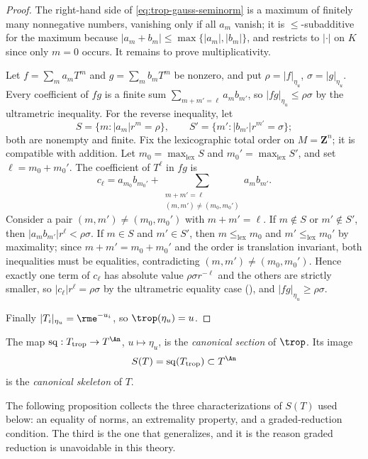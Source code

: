 \begin{proof}
The right-hand side of \eqref{eq:trop-gauss-seminorm} is a maximum of
finitely many nonnegative numbers, vanishing only if all $a_m$ vanish;
it is $\le$-subadditive for the maximum because
$|a_m+b_m|\le\max\{|a_m|,|b_m|\}$, and restricts to $|\cdot|$ on $K$ since
only $m=0$ occurs. It remains to prove multiplicativity.

Let $f=\sum_ma_mT^m$ and $g=\sum_mb_mT^m$ be nonzero, and put
$\rho=|f|_{\eta_u}$, $\sigma=|g|_{\eta_u}$. Every coefficient of $fg$ is a
finite sum $\sum_{m+m'=\ell}a_mb_{m'}$, so
$|fg|_{\eta_u}\le\rho\sigma$ by the ultrametric inequality. For the reverse
inequality, let
\[
 S=\{m:|a_m|r^m=\rho\},\qquad S'=\{m':|b_{m'}|r^{m'}=\sigma\};
\]
both are nonempty and finite. Fix the lexicographic total order on
$M=\mathbf Z^n$; it is compatible with addition. Let $m_0=\max_{\mathrm{lex}}S$
and $m_0'=\max_{\mathrm{lex}}S'$, and set $\ell=m_0+m_0'$. The coefficient
of $T^\ell$ in $fg$ is
\[
 c_\ell=a_{m_0}b_{m_0'}+\sum_{\substack{m+m'=\ell\\ (m,m')\ne(m_0,m_0')}}
 a_mb_{m'} .
\]
Consider a pair $(m,m')\ne(m_0,m_0')$ with $m+m'=\ell$. If $m\notin S$ or
$m'\notin S'$, then $|a_mb_{m'}|r^\ell<\rho\sigma$. If $m\in S$ and
$m'\in S'$, then $m\le_{\mathrm{lex}}m_0$ and $m'\le_{\mathrm{lex}}m_0'$
by maximality; since $m+m'=m_0+m_0'$ and the order is translation
invariant, both inequalities must be equalities, contradicting
$(m,m')\ne(m_0,m_0')$. Hence exactly one term of $c_\ell$ has absolute value
$\rho\sigma r^{-\ell}$ and the others are strictly smaller, so
$|c_\ell|r^\ell=\rho\sigma$ by the ultrametric equality case
(), and $|fg|_{\eta_u}\ge\rho\sigma$.

Finally $|T_i|_{\eta_u}=\rme^{-u_i}$, so $\trop(\eta_u)=u$.
\end{proof}

\begin{definition}
\label{def:trop-torus-skeleton}
The map $\sq:T_{\mathrm{trop}}\to T^{\An}$, $u\mapsto\eta_u$, is the
\emph{canonical section} of $\trop$. Its image
\[
 S(T)=\sq(T_{\mathrm{trop}})\subset T^{\An}
\]
is the \emph{canonical skeleton} of $T$.
\end{definition}

The following proposition collects the three characterizations of $S(T)$
used below: an equality of norms, an extremality property, and a
graded-reduction condition. The third is the one that generalizes, and it
is the reason graded reduction is unavoidable in this theory.

